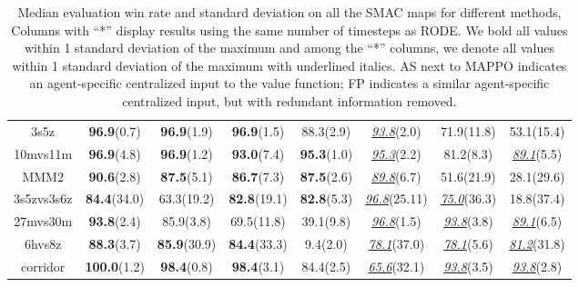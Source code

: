 \documentclass{article}
\theoremstyle{plain}
\theoremstyle{definition}
\theoremstyle{remark}
\begin{document}
\begin{table}[t!]
\begin{tabular}{ccccc|ccc}
\scriptsize{3s5z}             & \textbf{96.9}\scriptsize{(0.7)}  & \textbf{96.9}\scriptsize{(1.9)}  & \textbf{96.9}\scriptsize{(1.5)}  & 88.3\scriptsize{(2.9)}  & \emph{\underline{93.8}}\scriptsize{(2.0)}   & 71.9\scriptsize{(11.8)} & 53.1\scriptsize{(15.4)} \\
\scriptsize{10mvs11m}         & \textbf{96.9}\scriptsize{(4.8)}  & \textbf{96.9}\scriptsize{(1.2)}  & \textbf{93.0}\scriptsize{(7.4)}  & \textbf{95.3}\scriptsize{(1.0)}  & \emph{\underline{95.3}}\scriptsize{(2.2)}   & 81.2\scriptsize{(8.3)}  & \emph{\underline{89.1}}\scriptsize{(5.5)}  \\
\scriptsize{MMM2}             & \textbf{90.6}\scriptsize{(2.8)}  & \textbf{87.5}\scriptsize{(5.1)}  & \textbf{86.7}\scriptsize{(7.3)}  & \textbf{87.5}\scriptsize{(2.6)}  & \emph{\underline{89.8}}\scriptsize{(6.7)}   & 51.6\scriptsize{(21.9)} & 28.1\scriptsize{(29.6)} \\
\scriptsize{3s5zvs3s6z}       & \textbf{84.4}\scriptsize{(34.0)} & 63.3\scriptsize{(19.2)} & \textbf{82.8}\scriptsize{(19.1)} & \textbf{82.8}\scriptsize{(5.3)}  & \emph{\underline{96.8}}\scriptsize{(25.11)} & \emph{\underline{75.0}}\scriptsize{(36.3)} & 18.8\scriptsize{(37.4)} \\
\scriptsize{27mvs30m}         & \textbf{93.8}\scriptsize{(2.4)}  & 85.9\scriptsize{(3.8)}  & 69.5\scriptsize{(11.8)} & 39.1\scriptsize{(9.8)}  & \emph{\underline{96.8}}\scriptsize{(1.5)}   & \emph{\underline{93.8}}\scriptsize{(3.8)}  & \emph{\underline{89.1}}\scriptsize{(6.5)}  \\
\scriptsize{6hvs8z}           & \textbf{88.3}\scriptsize{(3.7)}  & \textbf{85.9}\textbf{}\scriptsize{(30.9)} & \textbf{84.4}\scriptsize{(33.3)} & 9.4\scriptsize{(2.0)}   & \emph{\underline{78.1}}\scriptsize{(37.0)}  & \emph{\underline{78.1}}\scriptsize{(5.6)}  & \emph{\underline{81.2}}\scriptsize{(31.8)} \\
\scriptsize{corridor}         & \textbf{100.0}\scriptsize{(1.2)} & \textbf{98.4}\scriptsize{(0.8)}  & \textbf{98.4}\scriptsize{(3.1)}  & 84.4\scriptsize{(2.5)}  & \emph{\underline{65.6}}\scriptsize{(32.1)}  & \emph{\underline{93.8}}\scriptsize{(3.5)}  & \emph{\underline{93.8}}\scriptsize{(2.8)}  \\
\bottomrule
\end{tabular}
\centering
\caption{Median evaluation win rate and standard deviation on all the SMAC maps for different methods, Columns with ``*'' display results using the same number of timesteps as RODE. We bold all values within 1 standard deviation of the maximum and among the ``*'' columns, we denote all values within 1 standard deviation of the maximum with underlined italics. AS next to MAPPO indicates an agent-specific centralized input to the value function; FP indicates a similar agent-specific centralized input, but with redundant information removed.  %
} 
\label{tab:SMAC-results}


\end{table}
\end{document}
